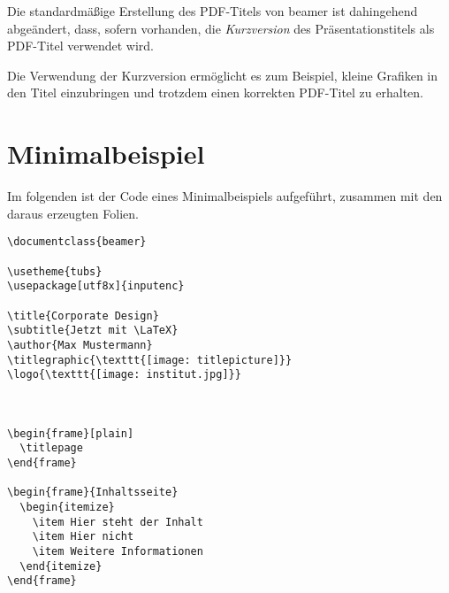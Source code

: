 Die standardmäßige Erstellung des PDF-Titels von beamer ist dahingehend
abgeändert, dass, sofern vorhanden, die \emph{Kurzversion} des Präsentationstitels
als PDF-Titel verwendet wird.

Die Verwendung der Kurzversion ermöglicht es zum Beispiel,
kleine Grafiken in den Titel einzubringen und
trotzdem einen korrekten PDF-Titel zu erhalten.


\section{Minimalbeispiel}%

Im folgenden ist der Code eines Minimalbeispiels aufgeführt, zusammen mit den
daraus erzeugten Folien.

\begin{verbatim}
\documentclass{beamer}

\usetheme{tubs}
\usepackage[utf8x]{inputenc}

\title{Corporate Design}
\subtitle{Jetzt mit \LaTeX}
\author{Max Mustermann}
\titlegraphic{\texttt{[image: titlepicture]}}
\logo{\texttt{[image: institut.jpg]}}



\begin{frame}[plain]
  \titlepage
\end{frame}

\begin{frame}{Inhaltsseite}
  \begin{itemize}
    \item Hier steht der Inhalt
    \item Hier nicht
    \item Weitere Informationen
  \end{itemize}
\end{frame}


\end{verbatim}

\begin{center}%

\end{center}

